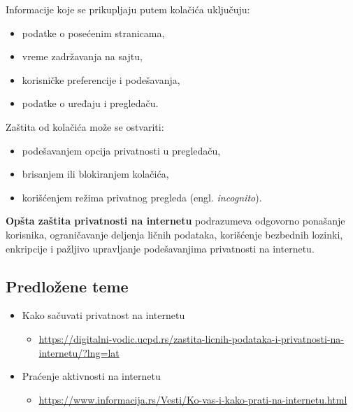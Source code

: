 \documentclass[a4paper, 12pt]{article}
\begin{document}
Informacije koje se prikupljaju putem kolačića uključuju:
\begin{itemize}
    \item podatke o posećenim stranicama,
    \item vreme zadržavanja na sajtu,
    \item korisničke preferencije i podešavanja,
    \item podatke o uređaju i pregledaču.
\end{itemize}

Zaštita od kolačića može se ostvariti:
\begin{itemize}
    \item podešavanjem opcija privatnosti u pregledaču,
    \item brisanjem ili blokiranjem kolačića,
    \item korišćenjem režima privatnog pregleda (engl. \textit{incognito}).
\end{itemize}

\textbf{Opšta zaštita privatnosti na internetu} podrazumeva odgovorno ponašanje korisnika,
ograničavanje deljenja ličnih podataka, korišćenje bezbednih lozinki, enkripcije i
pažljivo upravljanje podešavanjima privatnosti na internetu.


\subsection{Predložene teme}

\begin{itemize}
    \item Kako sačuvati privatnost na internetu
    \begin{itemize}
        \item \url{https://digitalni-vodic.ucpd.rs/zastita-licnih-podataka-i-privatnosti-na-internetu/?lng=lat}
    \end{itemize}
    \item Praćenje aktivnosti na internetu
    \begin{itemize}
        \item \url{https://www.informacija.rs/Vesti/Ko-vas-i-kako-prati-na-internetu.html}
    \end{itemize}
    
\end{itemize}
\end{document}

